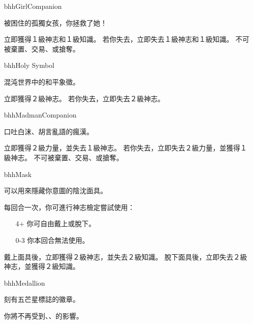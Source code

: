 \linebreak[0]%
\begin{OmenCard}{bhh}{Girl}{Companion}
  \begin{CardStory}
    被困住的孤獨女孩，你拯救了她！
  \end{CardStory}
  立即獲得１級神志和１級知識。\smallbreak
  若你失去\ThisName{}，立即失去１級神志和１級知識。\smallbreak
  \ThisName{}不可被棄置、交易、或搶奪。\smallbreak
\end{OmenCard}%
\linebreak[0]%
\begin{OmenCard}{bhh}{Holy Symbol}{}
  \begin{CardStory}
    混沌世界中的和平象徵。
  \end{CardStory}
  立即獲得２級神志。\smallbreak
  若你失去\ThisName{}，立即失去２級神志。\smallbreak
\end{OmenCard}%
\linebreak[0]%
\begin{OmenCard}{bhh}{Madman}{Companion}
  \begin{CardStory}
    口吐白沫、胡言亂語的瘋漢。
  \end{CardStory}
  立即獲得２級力量，並失去１級神志。\smallbreak
  若你失去\ThisName{}，立即失去２級力量，並獲得１級神志。\smallbreak
  \ThisName{}不可被棄置、交易、或搶奪。\smallbreak
\end{OmenCard}%
\linebreak[0]%
\begin{OmenCard}{bhh}{Mask}{}
  \begin{CardStory}
    可以用來隱藏你意圖的陰沈面具。
  \end{CardStory}
  每回合一次，你可進行神志檢定嘗試使用\ThisName{}：
  \begin{itemize}
    \item[4+] 你可自由戴上或脫下\ThisName{}。
    \item[0-3] 你本回合無法使用\ThisName{}。
  \end{itemize}
  戴上面具後，立即獲得２級神志，並失去２級知識。\smallbreak
  脫下面具後，立即失去２級神志，並獲得２級知識。\smallbreak
\end{OmenCard}%
\linebreak[0]%
\begin{OmenCard}{bhh}{Medallion}{}
  \begin{CardStory}
    刻有五芒星標誌的徽章。
  \end{CardStory}
  你將不再受到、、的影響。\smallbreak
\end{OmenCard}%
